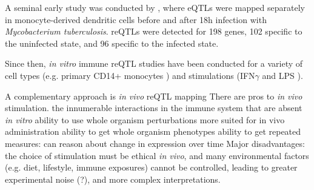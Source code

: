 \begin{outline}
\1 A seminal early study was conducted by \autocite{barreiro2012DecipheringGeneticArchitecture}, where eQTLs were mapped separately in monocyte-derived dendritic cells before and after 18h infection with \textit{Mycobacterium tuberculosis}.
    \2 reQTLs were detected for 198 genes, 102 specific to the uninfected state, and 96 specific to the infected state. 

    \2 Since then, \textit{in vitro} immune reQTL studies have been conducted for a variety of 
    cell types
        (e.g. primary CD14+ monocytes \autocite{fairfax2014InnateImmuneActivity}) 
    and stimulations 
    (IFN$\gamma$ and LPS \autocite{fairfax2014InnateImmuneActivity}).


\1 A complementary approach is \textit{in vivo} \gls{reQTL} mapping
    \2 There are pros to \textit{in vivo} stimulation.
        \3 the innumerable interactions in the immune system that are absent \textit{in vitro}
        \2 ability to use whole organism perturbations more suited for in vivo administration
        \3 ability to get whole organism phenotypes
        \3 ability to get repeated measures: can reason about change in expression over time
    \2 Major disadvantages: 
        \3 the choice of stimulation must be ethical \textit{in vivo}, 
        \3 and many environmental factors (e.g. diet, lifestyle, immune exposures) cannot be controlled, leading to greater experimental noise (?), and more complex interpretations.


\end{outline}

